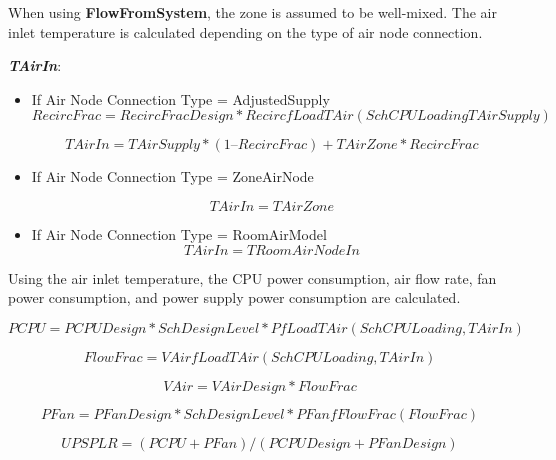 When using \textbf{FlowFromSystem}, the zone is assumed to be well-mixed. The air inlet temperature is calculated depending on the type of air node connection.

\emph{\textbf{TAirIn}}:

\begin{itemize}
    \tightlist
  \item
    If Air Node Connection Type = AdjustedSupply
\begin{equation}
RecircFrac = RecircFracDesign * RecircfLoadTAir(SchCPULoading TAirSupply)
\end{equation}

\begin{equation}
TAirIn = TAirSupply * (1 – RecircFrac) +TAirZone * RecircFrac
\end{equation}

  \item
    If Air Node Connection Type = ZoneAirNode
    
\begin{equation}
TAirIn = TAirZone
\end{equation}

  \item
    If Air Node Connection Type = RoomAirModel
\begin{equation}
TAirIn = TRoomAirNodeIn
\end{equation}

\end{itemize}

Using the air inlet temperature, the CPU power consumption, air flow rate, fan power consumption, and power supply power consumption are calculated.

\begin{equation}
PCPU = PCPUDesign * SchDesignLevel * PfLoadTAir(SchCPULoading, TAirIn)
\end{equation}

\begin{equation}
FlowFrac = VAirfLoadTAir(SchCPULoading, TAirIn)
\end{equation}

\begin{equation}
VAir = VAirDesign * FlowFrac
\end{equation}

\begin{equation}
PFan = PFanDesign * SchDesignLevel * PFanfFlowFrac(FlowFrac)
\end{equation}

\begin{equation}
UPSPLR = (PCPU + PFan) / (PCPUDesign + PFanDesign)
\end{equation}

